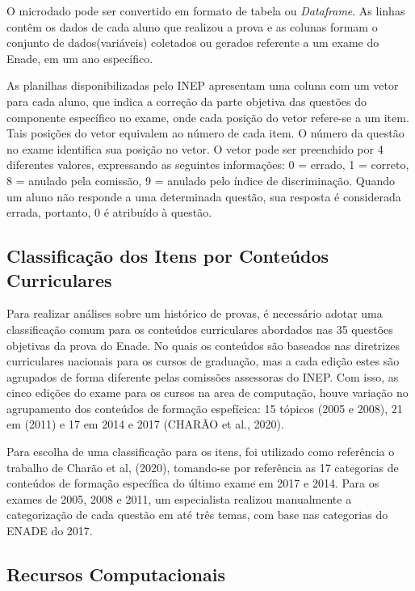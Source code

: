 \documentclass[12pt]{article}
\begin{document}
O microdado pode ser convertido em formato de tabela ou \textit{Dataframe}. As linhas contêm os dados de cada aluno que realizou a prova e as colunas formam o conjunto de dados(variáveis) coletados ou gerados referente a um exame do Enade, em um ano específico.


As planilhas disponibilizadas pelo INEP apresentam uma coluna com um vetor para cada aluno, que
indica a correção da parte objetiva das questões do componente específico no exame, onde cada posição do vetor refere-se a um item. Tais posições do vetor equivalem ao número de cada item. O número da questão no exame identifica sua posição no vetor. O vetor pode ser preenchido por 4 diferentes valores, expressando as seguintes informações: 0 = errado, 1 = correto, 8 = anulado pela comissão, 9 = anulado pelo índice de discriminação. Quando um aluno não responde a uma determinada questão, sua resposta é considerada errada, portanto, 0 é atribuído à
questão.

\subsection{Classificação dos Itens por Conteúdos Curriculares}

Para realizar análises sobre um histórico de provas, é necessário adotar uma classificação comum para os conteúdos curriculares abordados nas 35 questões objetivas da prova do Enade. No quais os conteúdos são baseados nas diretrizes curriculares nacionais para os cursos de graduação, mas a cada edição estes são agrupados de forma diferente pelas comissões assessoras do INEP. Com isso, as cinco edições do exame para os cursos na area de computação, houve variação no agrupamento dos conteúdos de formação espefícica: 15 tópicos (2005 e 2008), 21 em (2011) e 17 em 2014 e 2017 (CHARÃO et al., 2020).

Para escolha de uma classificação para os itens, foi utilizado como referência o trabalho de Charão et al, (2020), tomando-se por referência as 17 categorias de conteúdos de formação específica do último exame em 2017 e 2014. Para os exames de 2005, 2008 e 2011, um especialista realizou manualmente a categorização de cada questão em até três temas, com base nas categorias do ENADE do 2017. 



\subsection{Recursos Computacionais}
\label{sec:metbet}
\end{document}
